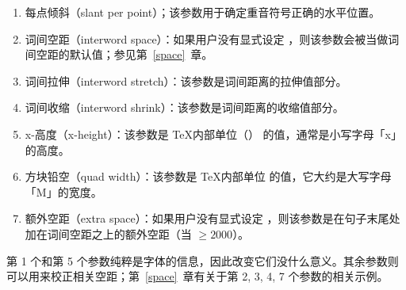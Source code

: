\documentclass{book}
\begin{document}
\begin{enumerate}
\item 每点倾斜（slant per point）；该参数用于确定重音符号正确的水平位置。
\item 词间空距（interword space）：如果用户没有显式设定 ，则该参数会被当做词间空距的默认值；参见第~\ref{space}~章。
\item 词间拉伸（interword stretch）：该参数是词间距离的拉伸值部分。
\item 词间收缩（interword shrink）：该参数是词间距离的收缩值部分。
\item x-高度（x-height）：该参数是 \TeX 内部单位（） 的值，通常是小写字母「x」的高度。
\item 方块铅空（quad width）：该参数是 \TeX 内部单位  的值，它大约是大写字母「M」的宽度。
\item 额外空距（extra space）：如果用户没有显式设定 ，则该参数是在句子末尾处加在词间空距之上的额外空距（当 ${}\geqslant2000$）。
\end{enumerate}

第 1 个和第 5 个参数纯粹是字体的信息，因此改变它们没什么意义。其余参数则可以用来校正相关空距；第~\ref{space}~章有关于第 2, 3, 4, 7 个参数的相关示例。
\end{document}
